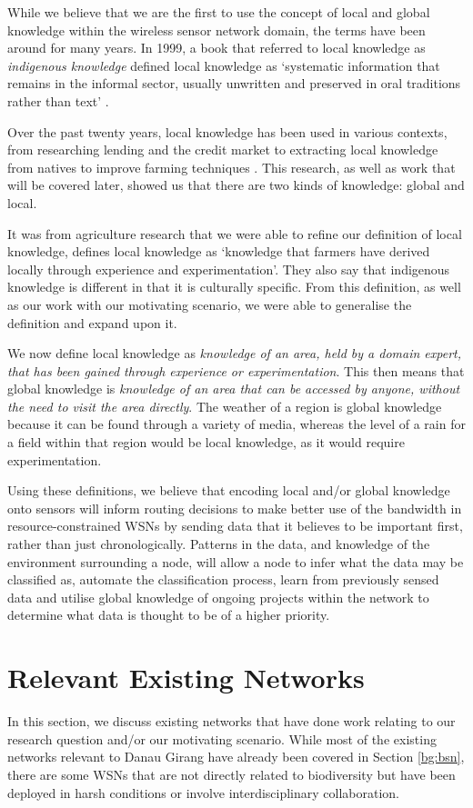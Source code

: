 While we believe that we are the first to use the concept of local and global knowledge within the wireless sensor network domain, the terms have been around for many years. In 1999, a book that referred to local knowledge as \textit{indigenous knowledge} defined local knowledge as ‘systematic information that remains in the informal sector, usually unwritten and preserved in oral traditions rather than text’ \cite{LadislausM.Semali}. 

Over the past twenty years, local knowledge has been used in various contexts, from researching lending and the credit market \cite{Stiglitz1990} to extracting local knowledge from natives to improve farming techniques \cite{DEWALT}. This research, as well as work that will be covered later, showed us that there are two kinds of knowledge: global and local. 

It was from agriculture research that we were able to refine our definition of local knowledge, \cite{Joshi2001} defines local knowledge as ‘knowledge that farmers have derived locally through experience and experimentation’. They also say that indigenous knowledge is different in that it is culturally specific. From this definition, as well as our work with our motivating scenario, we were able to generalise the definition and expand upon it.

We now define local knowledge as \textit{knowledge of an area, held by a domain expert, that has been gained through experience or experimentation}. This then means that global knowledge is \textit{knowledge of an area that can be accessed by anyone, without the need to visit the area directly}. The weather of a region is global knowledge because it can be found through a variety of media, whereas the level of a rain for a field within that region would be local knowledge, as it would require experimentation.

Using these definitions, we believe that encoding local and/or global knowledge onto sensors will inform routing decisions to make better use of the bandwidth in resource-constrained WSNs by sending data that it believes to be important first, rather than just chronologically. Patterns in the data, and knowledge of the environment surrounding a node, will allow a node to infer what the data may be classified as, automate the classification process, learn from previously sensed data and utilise global knowledge of ongoing projects within the network to determine what data is thought to be of a higher priority.

\section{Relevant Existing Networks} \label{bg:rsn}
	In this section, we discuss existing networks that have done work relating to our research question and/or our motivating scenario. While most of the existing networks relevant to Danau Girang have already been covered in Section \ref{bg:bsn}, there are some WSNs that are not directly related to biodiversity but have been deployed in harsh conditions or involve interdisciplinary collaboration.

